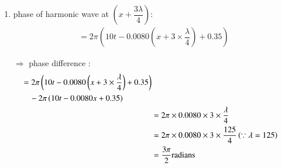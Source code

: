 \documentclass[journal,12pt,twocolumn]{IEEEtran}
\theoremstyle{remark}
\begin{document}
\begin{enumerate} [label=(\alph*)]
    \item phase of harmonic wave at $\left(x+\dfrac{3\lambda}{4} \right ) $:
\begin{align}
    = 2\pi \left(10t - 0.0080\left(x+3\times \dfrac{\lambda}{4}\right) + 0.35\right) 
\end{align}
\begin{center}
\end{center}

$\Rightarrow$  phase difference :
\begin{align}
    \begin{split}
        &= 2\pi\left(10t - 0.0080\left(x+3 \times \dfrac{\lambda}{4}\right) + 0.35\right) \\
        &\quad - 2\pi \left(10t - 0.0080x  +0.35\right)
    \end{split}
    \\
    &= 2\pi \times 0.0080 \times 3 \times \dfrac{\lambda}{4} \\
    &= 2\pi \times 0.0080 \times 3 \times \dfrac{125}{4} \left(\because\lambda=125\right) \\
    &= \dfrac{3\pi}{2} \text{radians}
\end{align}

\end{enumerate}
\end{document}
